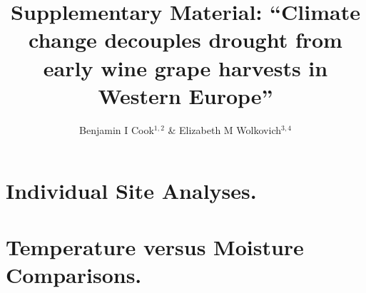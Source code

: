 \documentclass[12pt]{article}
\title{Supplementary Material: 
``Climate change decouples drought from early wine grape harvests in Western Europe''}
\author{Benjamin I Cook$^{1,2}$ \& Elizabeth M Wolkovich$^{3,4}$}
\begin{document}
\maketitle

\section*{Individual Site Analyses.}

\section*{Temperature versus Moisture Comparisons.}


\end{document}
